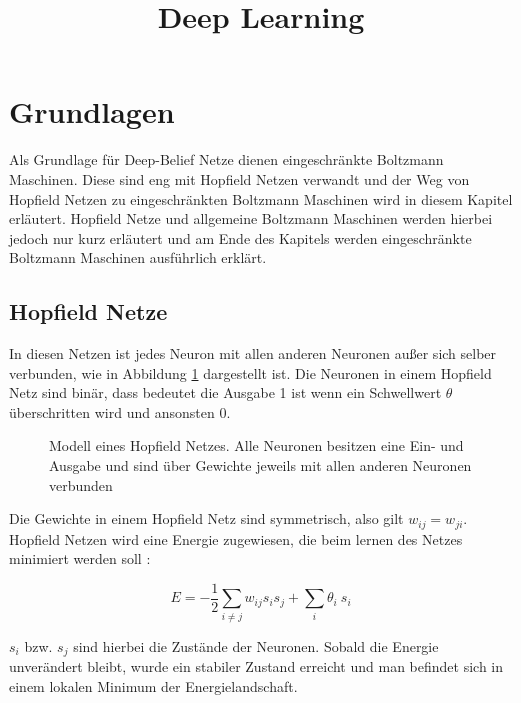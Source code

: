 \documentclass[12pt]{article}
\title{Deep Learning}
\begin{document}
	\maketitle

	\newpage

	\tableofcontents
	
	\newpage
	\section{Grundlagen}
	Als Grundlage für Deep-Belief Netze dienen eingeschränkte Boltzmann Maschinen. Diese sind eng mit Hopfield Netzen verwandt und der Weg von Hopfield Netzen zu eingeschränkten Boltzmann Maschinen wird in diesem Kapitel erläutert. Hopfield Netze und allgemeine Boltzmann Maschinen werden hierbei jedoch nur kurz erläutert und am Ende des Kapitels werden eingeschränkte Boltzmann Maschinen ausführlich erklärt.
	
	
	\subsection{Hopfield Netze}	
	In diesen Netzen ist jedes Neuron mit allen anderen Neuronen außer sich selber verbunden, wie in Abbildung \ref{HopfieldNetz} dargestellt ist.  Die Neuronen in einem Hopfield Netz sind binär, dass bedeutet die Ausgabe 1 ist wenn ein Schwellwert $\theta$ überschritten wird und ansonsten 0.
	\begin{figure}[H]
	\center
	
	\caption{Modell eines Hopfield Netzes. Alle Neuronen besitzen eine Ein- und Ausgabe und sind über Gewichte jeweils mit allen anderen Neuronen verbunden}
	\label{HopfieldNetz}
	\end{figure}
Die Gewichte in einem Hopfield Netz sind symmetrisch, also gilt $w_{ij} = w_{ji}$. Hopfield Netzen wird eine Energie zugewiesen, die beim lernen des Netzes minimiert werden soll \cite{Hopfield}:

\begin{equation}
E = -\frac{1}{2}\sum_{i\neq j}{w_{ij}{s_i}{s_j}}+\sum_i{\theta_i\ s_i}
\end{equation}

$s_i$ bzw. $s_j$ sind hierbei die Zustände der Neuronen. Sobald die Energie unverändert bleibt, wurde ein stabiler Zustand erreicht und man befindet sich in einem lokalen Minimum der Energielandschaft.
\end{document}
